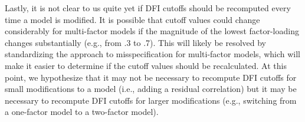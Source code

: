 \documentclass[
]{book}
\begin{document}
Lastly, it is not clear to us quite yet if DFI cutoffs should be recomputed every time a model is modified. It is possible that cutoff values could change considerably for multi-factor models if the magnitude of the lowest factor-loading changes substantially (e.g., from .3 to .7). This will likely be resolved by standardizing the approach to misspecification for multi-factor models, which will make it easier to determine if the cutoff values should be recalculated. At this point, we hypothesize that it may not be necessary to recompute DFI cutoffs for small modifications to a model (i.e., adding a residual correlation) but it may be necessary to recompute DFI cutoffs for larger modifications (e.g., switching from a one-factor model to a two-factor model).

  
\end{document}
